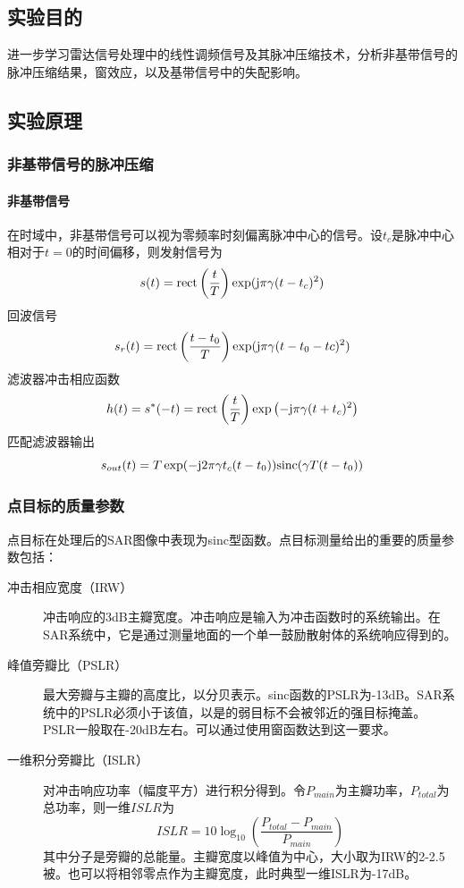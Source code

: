 \subsection{实验目的}
进一步学习雷达信号处理中的线性调频信号及其脉冲压缩技术，分析非基带信号的脉冲压缩结果，窗效应，以及基带信号中的失配影响。
\subsection{实验原理}
\subsubsection{非基带信号的脉冲压缩}
\paragraph{非基带信号}
在时域中，非基带信号可以视为零频率时刻偏离脉冲中心的信号。设$t_c$是脉冲中心相对于$t=0$的时间偏移，则发射信号为
\begin{equation}
s(t) = \mathrm{rect}\left( \frac{t}{T} \right)\exp(\mathrm{j}\pi\gamma(t-t_c)^2)
\end{equation}
回波信号
\begin{equation}
s_r(t)=\mathrm{rect}\left( \frac{t-t_0}{T} \right)\exp(\mathrm{j}\pi\gamma(t-t_0-tc)^2)
\end{equation}
滤波器冲击相应函数
\begin{equation}
h(t)=s^*(-t)=\mathrm{rect}\left( \frac{t}{T} \right)\exp\left(-\mathrm{j}\pi\gamma(t+t_c)^2\right)
\end{equation}
匹配滤波器输出
\begin{equation}
s_{out}(t)=T\exp(-\mathrm{j}2\pi\gamma t_c(t-t_0))\mathrm{sinc}(\gamma T(t-t_0))
\end{equation}
\subsubsection{点目标的质量参数}
点目标在处理后的SAR图像中表现为sinc型函数。点目标测量给出的重要的质量参数包括：
\begin{description}
	\item[冲击相应宽度（IRW）] 冲击响应的3dB主瓣宽度。冲击响应是输入为冲击函数时的系统输出。在SAR系统中，它是通过测量地面的一个单一鼓励散射体的系统响应得到的。
	\item[峰值旁瓣比（PSLR）] 最大旁瓣与主瓣的高度比，以分贝表示。sinc函数的PSLR为-13dB。SAR系统中的PSLR必须小于该值，以是的弱目标不会被邻近的强目标掩盖。PSLR一般取在-20dB左右。可以通过使用窗函数达到这一要求。
	\item[一维积分旁瓣比（ISLR）] 对冲击响应功率（幅度平方）进行积分得到。令$P_{main}$为主瓣功率，$P_{total}$为总功率，则一维$ISLR$为
	\[ ISLR=10\log_{10}\left( \frac{P_{total}-P_{main}}{P_{main}} \right) \]
	其中分子是旁瓣的总能量。主瓣宽度以峰值为中心，大小取为IRW的2-2.5被。也可以将相邻零点作为主瓣宽度，此时典型一维ISLR为-17dB。
\end{description}

